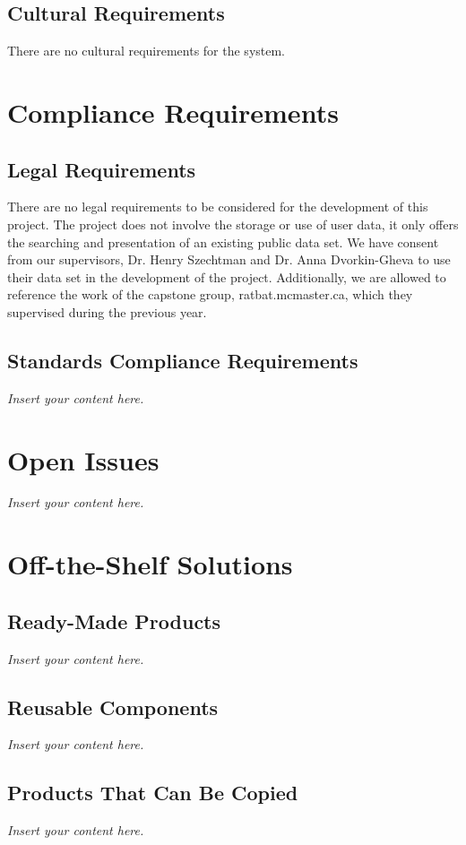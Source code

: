 \documentclass[12pt]{article}
\newcommand{\lips}{\textit{Insert your content here.}}
\begin{document}
\subsection{Cultural Requirements}
\par{There are no cultural requirements for the system.}

\section{Compliance Requirements}
\subsection{Legal Requirements}

\par{There are no legal requirements to be considered for the development of this project. The project does not involve the storage or 
use of user data, it only offers the searching and presentation of an existing public data set. \newline \indent We have consent from our 
supervisors, Dr. Henry Szechtman and Dr. Anna Dvorkin-Gheva to use their data set in the development of the project. Additionally, 
we are allowed to reference the work of the capstone group, ratbat.mcmaster.ca, which they supervised during the previous year.}

\subsection{Standards Compliance Requirements}
\lips

\section{Open Issues}
\lips

\section{Off-the-Shelf Solutions}
\subsection{Ready-Made Products}
\lips
\subsection{Reusable Components}
\lips
\subsection{Products That Can Be Copied}
\lips
\end{document}
